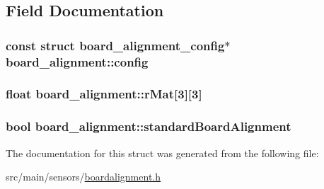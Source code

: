 \subsection{Field Documentation}
\hypertarget{structboard__alignment_a82f9a5c77030df92a1b68c7764f85217}{
\subsubsection[{config}]{\setlength{\rightskip}{0pt plus 5cm}const struct {\bf board\+\_\+alignment\+\_\+config}$\ast$ board\+\_\+alignment\+::config}}\label{structboard__alignment_a82f9a5c77030df92a1b68c7764f85217}
\hypertarget{structboard__alignment_aaac1defe86485be6a6c5a8445f3c15cb}{
\subsubsection[{r\+Mat}]{\setlength{\rightskip}{0pt plus 5cm}float board\+\_\+alignment\+::r\+Mat\mbox{[}3\mbox{]}\mbox{[}3\mbox{]}}}\label{structboard__alignment_aaac1defe86485be6a6c5a8445f3c15cb}
\hypertarget{structboard__alignment_a593d82f8484e676b0dac52037e9fefc2}{
\subsubsection[{standard\+Board\+Alignment}]{\setlength{\rightskip}{0pt plus 5cm}bool board\+\_\+alignment\+::standard\+Board\+Alignment}}\label{structboard__alignment_a593d82f8484e676b0dac52037e9fefc2}


The documentation for this struct was generated from the following file\+:\begin{DoxyCompactItemize}
\item 
src/main/sensors/\hyperlink{sensors_2boardalignment_8h}{boardalignment.\+h}\end{DoxyCompactItemize}
